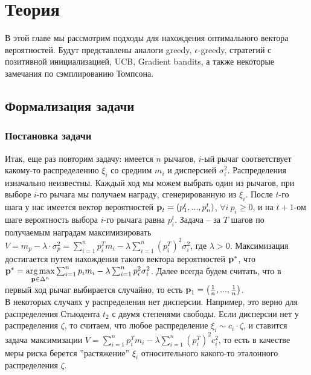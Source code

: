 \chapter{Теория} %

\label{Theory} %

\newcommand{\lrarr}{\Leftrightarrow}


В этой главе мы рассмотрим подходы для нахождения оптимального вектора вероятностей. Будут представлены аналоги greedy, $\epsilon$-greedy, стратегий с позитивной инициализацией, UCB, Gradient bandits, а также некоторые замечания по сэмплированию Томпсона.  

\section{Формализация задачи}

\subsection{Постановка задачи}

Итак, еще раз повторим задачу: имеется $n$ рычагов, $i$-ый рычаг соответствует какому-то распределению $\xi_i$ со средним $m_i$ и дисперсией $\sigma_i^2$. Распределения изначально неизвестны. Каждый ход мы можем выбрать один из рычагов, при выборе $i$-го рычага мы получаем награду, сгенерированную из $\xi_i$. После $t$-го шага у нас имеется вектор вероятностей $\textbf{p}_t = (p_1^t, ..., p_n^t)$, $\forall i \: p_i \geq 0$, и на $t+1$-ом шаге вероятность выбора $i$-го рычага равна $p_i^t$. Задача -- за $T$ шагов по получаемым наградам максимизировать $V = m_p - \lambda \cdot \sigma_p^2 = \sum_{i=1}^n p_i^T m_i - \lambda \sum_{i=1}^n (p_i^T)^2 \sigma_i^2$, где $\lambda > 0$. Максимизация достигается путем нахождения такого вектора вероятностей $\textbf{p}^*$, что $\textbf{p}^* = \underset{\textbf{p} \in \Delta^n}{\arg \max} \sum_{i=1}^n p_i m_i - \lambda \sum_{i=1}^n p_i^2 \sigma_i^2$. Далее всегда будем считать, что в первый ход рычаг выбирается случайно, то есть $\textbf{p}_1 = \left( \frac{1}{n}, ..., \frac{1}{n} \right)$. \\

В некоторых случаях у распределения нет дисперсии. Например, это верно для распределения Стьюдента $t_2$ с двумя степенями свободы. Если дисперсии нет у распределения $\zeta$, то считаем, что любое распределение $\xi_i \sim c_i \cdot \zeta$, и ставится задача максимизации $V = \sum_{i=1}^n p_i^T m_i - \lambda \sum_{i=1}^n (p_i^T)^2 c_i^2$, то есть в качестве меры риска берется ''растяжение'' $\xi_i$ относительного какого-то эталонного распределения $\zeta$.

